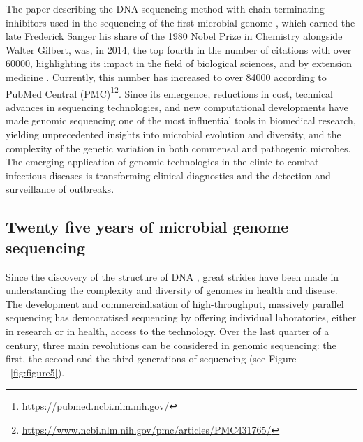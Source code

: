 The paper describing the DNA-sequencing method with chain-terminating inhibitors used in the sequencing of the first microbial genome \citep{sanger_dna_1977}, which earned the late Frederick Sanger his share of the 1980 Nobel Prize in Chemistry alongside Walter Gilbert, was, in 2014, the top fourth in the number of citations with over 60000, highlighting its impact in the field of biological sciences, and by extension medicine \citep{van_noorden_top_2014}. 
Currently, this number has increased to over 84000 according to PubMed Central\textsuperscript{\small\textregistered} (PMC)\footnote{\url{https://pubmed.ncbi.nlm.nih.gov/}}\footnote{\url{ https://www.ncbi.nlm.nih.gov/pmc/articles/PMC431765/}}. 
Since its emergence, reductions in cost, technical advances in sequencing technologies, and new computational developments have made genomic sequencing one of the most influential tools in biomedical research, yielding unprecedented insights into microbial evolution and diversity, and the complexity of the genetic variation in both commensal and pathogenic microbes. 
The emerging application of genomic technologies in the clinic to combat infectious diseases is transforming clinical diagnostics and the detection and surveillance of outbreaks. 

\subsection{Twenty five years of microbial genome sequencing} \label{ssec:_intro_sequencing}

Since the discovery of the structure of DNA \citep{watson_molecular_1953}, great strides have been made in understanding the complexity and diversity of genomes in health and disease. 
The development and commercialisation of high-throughput, massively parallel sequencing has democratised sequencing by offering individual laboratories, either in research or in health, access to the technology. 
Over the last quarter of a century, three main revolutions can be considered in genomic sequencing: the first, the second and the third generations of sequencing (see Figure ~\ref{fig:figure5}).

